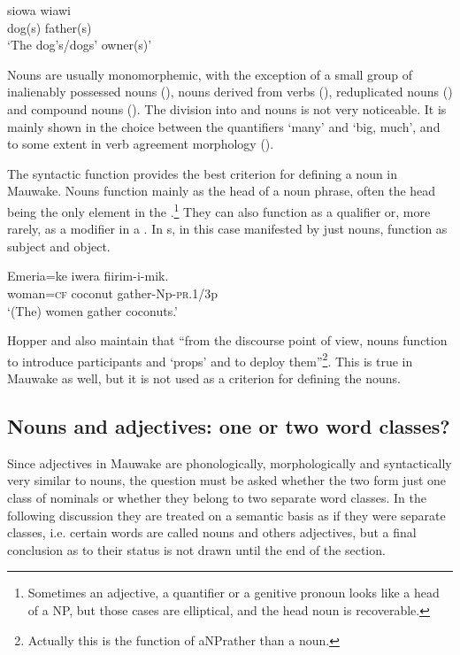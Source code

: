 \ea%
\label{ex:3:x1}
\gll siowa wiawi\\
dog(s) father(s)\\
\glt`The dog's/dogs' owner(s)'
\z

Nouns are usually monomorphemic, with the exception of a small group of inalienably possessed nouns (), nouns derived from verbs (), reduplicated nouns () and compound nouns (). The division into  and  nouns is not very noticeable. It is mainly shown in the choice between the quantifiers  `many' and  `big, much', and to some extent in verb agreement morphology ().

The syntactic function provides the best criterion for defining a noun in Mauwake. Nouns function mainly as the head of a noun phrase, often the head being the only element in the .\footnote{Sometimes an adjective, a quantifier or a genitive pronoun looks like a head of a NP, but those cases are elliptical, and the head noun is recoverable.} They can also function as a qualifier or, more rarely, as a modifier in a . In  s, in this case manifested by just nouns, function as subject and object.

\ea%
\label{ex:3:x2}
\gll Emeria=ke iwera fiirim-i-mik.\\
 woman=\textsc{cf} coconut gather-Np-\textsc{pr}.1/3p\\
\glt`(The) women gather coconuts.'
\z

Hopper and \citet[710]{Thompson1984} also maintain that {``from the discourse point of view, nouns function to introduce participants and `props' and to deploy them''}\footnote{Actually this is the function of a\textsc{NP}rather than a noun.}{.} This is true in Mauwake as well, but it is not used as a criterion for defining the nouns.

\subsection{Nouns and adjectives: one or two word classes?}\label{sec:3.2.2}
{}
Since adjectives in Mauwake are phonologically, morphologically and syntactically very similar to nouns, the question must be asked whether the two form just one class of nominals or whether they belong to two separate word classes. In the following discussion they are treated on a semantic basis as if they were separate classes, i.e. certain words are called nouns and others adjectives, but a final conclusion as to their status is not drawn until the end of the section.

